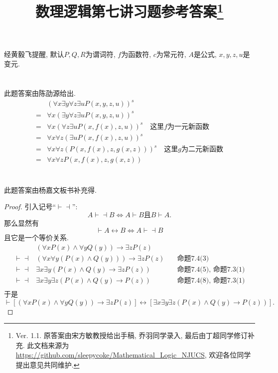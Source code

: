 \documentclass{article}
\newcommand{\vv}[0]{\vdash\dashv}
\begin{document}
\title{数理逻辑第七讲习题参考答案\footnote{Ver. 1.1. 原答案由宋方敏教授给出手稿, 乔羽同学录入, 最后由丁超同学修订补充. 此文档来源为{\url{https://github.com/sleepycoke/Mathematical_Logic_NJUCS}},
 欢迎各位同学提出意见共同维护. 
}}
\maketitle
经黄毅飞提醒, 默认$P,Q,R$为谓词符, $f$为函数符, $c$为常元符, $A$是公式, $x, y, z, u$是变元. 
\section{}
此题答案由陈劭源给出. 	
\begin{align*}
  &(\forall x \exists y \forall z \exists u P(x, y, z, u))^s \\
  =& \forall x (\exists y \forall z \exists u P(x, y, z, u))^s \\
  =& \forall x (\forall z \exists u P(x, f(x), z, u))^s\quad \text{这里$f$为一元新函数}\\
  =& \forall x \forall z (\exists u P(x, f(x), z, u))^s \\
  =& \forall x \forall z (P(x, f(x), z, g(x, z)))^s \quad \text{这里$g$为二元新函数}\\
  =& \forall x \forall z P(x, f(x), z, g(x, z))
\end{align*}

\section{}
此题答案由杨嘉文板书补充得.
\begin{proof}
引入记号``$\vv$'':
$$A \vv B \Leftrightarrow A\vdash B \text{且} B \vdash A. $$
那么显然有
$$\vdash A \leftrightarrow B \Leftrightarrow A\vv B $$
且它是一个等价关系. 
\begin{align*}
  &(\forall x P(x) \wedge \forall y Q(y)) \rightarrow \exists z P(z) \\
  \vv & (\forall x \forall y (P(x) \wedge Q(y))) \rightarrow \exists z P(z) \quad &\text{命题7.4(3)}\\
  \vv & \exists x \exists y (P(x) \wedge Q(y) \rightarrow \exists z P(z)) \quad &\text{命题7.4(5), 命题7.3(1)}\\
  \vv & \exists x \exists y \exists z (P(x) \wedge Q(y) \rightarrow P(z))\quad &\text{命题7.4(8), 命题7.3(1)}\\
\end{align*}
于是
$$\vdash [(\forall x P(x) \wedge \forall y Q(y)) \rightarrow \exists z P(z)]\leftrightarrow [\exists x \exists y \exists z (P(x) \wedge Q(y) \rightarrow P(z))].$$
\end{proof}
\end{document}

